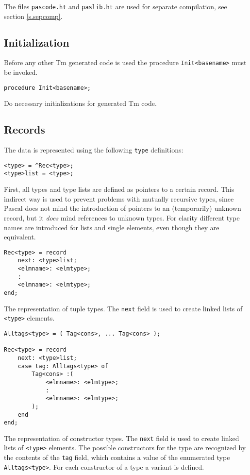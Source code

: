 \documentclass{article}
\newcommand{\Pascal}{\sf Pascal}
\newcommand{\Tm}{\sf Tm}
\newenvironment{desc}{\nopagebreak\vspace{-\bigskipamount}\vspace{-\parskip}\begin{list}{}{\setlength{\topsep}{0pt}\setlength{\rightmargin}{0pt}}\item[]}{\end{list}}
\begin{document}
\par
The files {\tt pascode.ht} and {\tt paslib.ht} are used for
separate compilation,
see section \ref{s.sepcomp}.
\subsection{Initialization}
Before any other {\Tm} generated code is used the procedure
{\tt Init<basename>} must be invoked.
\begin{verbatim}
procedure Init<basename>;
\end{verbatim}
\begin{desc}
Do necessary initializations for generated {\Tm} code.
\end{desc}
\subsection{Records}
The data is represented using the following {\tt type} definitions:
\begin{verbatim}
<type> = ^Rec<type>;
<type>list = <type>;
\end{verbatim}
\begin{desc}
First, all types and type lists are defined as pointers to a certain
record.
This indirect way is used to prevent problems with mutually recursive
types, since {\Pascal} does not mind the introduction of pointers to an
(temporarily) unknown record,
but it {\em does} mind references to unknown types.
For clarity
different type names are introduced for lists and single elements,
even though they are equivalent.
\end{desc}
\begin{verbatim}
Rec<type> = record
    next: <type>list;
    <elmname>: <elmtype>;
    :
    <elmname>: <elmtype>;
end;
\end{verbatim}
\begin{desc}
The representation of tuple types.
The {\tt next} field is used to create linked lists of {\tt <type>} elements.
\end{desc}
\begin{verbatim}
Alltags<type> = ( Tag<cons>, ... Tag<cons> );

Rec<type> = record
    next: <type>list;
    case tag: Alltags<type> of
        Tag<cons> :(
            <elmname>: <elmtype>;
            :
            <elmname>: <elmtype>;
        );
    end
end;
\end{verbatim}
\begin{desc}
The representation of constructor types.
The {\tt next} field is used to create linked lists of {\tt <type>} elements.
The possible constructors for the type are recognized by the contents of
the {\tt tag} field,
which contains a value of the enumerated type {\tt Alltags<type>}.
For each constructor of a type a variant is defined.
\end{desc}
\end{document}
